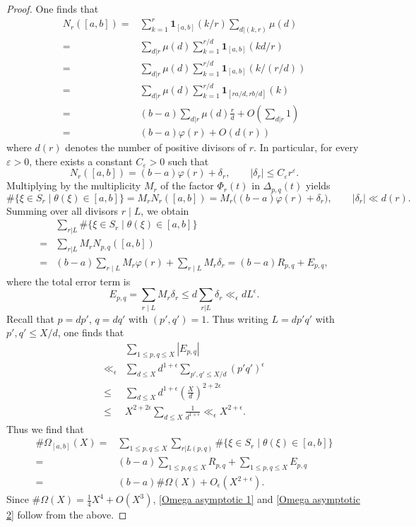 \documentclass[table]{amsart}
\numberwithin{equation}{section}
\begin{document}
\begin{proof}
One finds that 
\[\begin{split}N_r([a,b])=&\sum_{k=1}^r \mathbf{1}_{[a,b]}(k/r)\sum_{d|(k,r)} \mu(d)\\
=& \sum_{d|r} \mu(d)\sum_{k=1}^{r/d} \mathbf{1}_{[a,b]}(kd/r)\\
=& \sum_{d|r} \mu(d)\sum_{k=1}^{r/d} \mathbf{1}_{[a,b]}(k/(r/d))\\
=& \sum_{d|r} \mu(d)\sum_{k=1}^{r/d} \mathbf{1}_{[ra/d,rb/d]}(k)\\
=& (b-a)\sum_{d|r} \mu(d)\frac{r}{d}+O\left(\sum_{d|r} 1\right)\\
=& (b-a)\varphi(r) + O(d(r))
\end{split}\]
where $d(r)$ denotes the number of positive divisors of $r$. In particular, for every $\varepsilon>0$, there exists a constant $C_\varepsilon>0$
such that
\[
N_r([a,b]) = (b-a)\varphi(r) + \delta_r, \qquad |\delta_r|\le C_\varepsilon r^\varepsilon.
\]
\noindent Multiplying by the multiplicity $M_r$ of the factor $\Phi_r(t)$ in
$\Delta_{p,q}(t)$ yields
\[
\#\{\xi\in S_r\mid \theta(\xi)\in[a,b]\}
= M_r N_r([a,b])
= M_r\big((b-a)\varphi(r)+\delta_r\big),
\qquad |\delta_r|\ll d(r).
\]
\noindent Summing over all divisors $r\mid L$, we obtain
\begin{equation}\label{eq:local-distribution}
\begin{split}
& \sum_{r|L}\# \{\xi\in S_r\mid \theta(\xi)\in [a,b]\}\\
=&\sum_{r|L} M_r N_{p,q}([a,b])\\
=&(b-a)\sum_{r\mid L} M_r\varphi(r)
+\sum_{r\mid L} M_r\delta_r
=(b-a)R_{p,q}+E_{p,q},
\end{split}
\end{equation}
where the total error term is
\[
E_{p,q}=\sum_{r\mid L}M_r\delta_r\leq d\sum_{r|L} \delta_r\ll_{\epsilon} d L^{\epsilon}.
\]
\noindent Recall that $p=dp'$, $q=dq'$ with $(p',q')=1$. Thus writing $L=d p'q'$ with $p',q'\le X/d$, one finds that
\[\begin{split}
&\sum_{1\le p,q\le X} |E_{p,q}| \\
\ll_{\epsilon} &\sum_{d\le X} d^{1+\epsilon} \sum_{p',q'\le X/d} (p'q')^\epsilon\\
\leq &\sum_{d\le X} d^{1+\epsilon} \left(\frac{X}{d}\right)^{2+2\epsilon} \\
\leq & X^{2+2\epsilon}\sum_{d\le X} \frac{1}{d^{1+\epsilon}}
\ll_{\epsilon} X^{2+\epsilon}.
\end{split}
\]
Thus we find that 
\[\begin{split}
    \# \Omega_{[a,b]}(X)= &
    \sum_{1\leq p,q\leq X}\sum_{r|L(p,q)}\# \{\xi\in S_r\mid \theta(\xi)\in [a,b]\}\\
    = &(b-a) \sum_{1\leq p,q\leq X} R_{p,q}+\sum_{1\leq p,q\leq X}E_{p,q}\\
    = &(b-a)\#\Omega(X)+O_{\epsilon}(X^{2+\epsilon}).
\end{split}\]
Since $\#\Omega(X)=\frac{1}{4} X^4+O(X^3)$, \eqref{Omega asymptotic 1} and \eqref{Omega asymptotic 2} follow from the above.
\end{proof}
\end{document}

